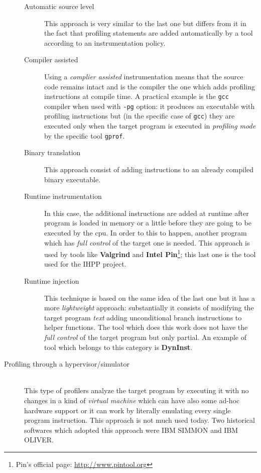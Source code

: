 \documentclass[a4paper,10pt]{report}
\begin{document}
\begin{description}
\begin{description}
\item[Automatic source level] This approach is very similar to the last one but
differs from it in the fact that profiling statements are added automatically by
a tool according to an instrumentation policy.

\item[Compiler assisted] Using a \emph{complier assisted} instrumentation means
that the source code remains intact and is the compiler the one which adds
profiling instructions at compile time. A practical example is the \verb|gcc| compiler when
used with \verb|-pg| option: it produces an executable with profiling
instructions but (in the specific case of \verb|gcc|) they are executed only when the
target program is executed in \emph{profiling mode} by the specific tool
\verb|gprof|.

\item[Binary translation]
This approach consist of adding instructions to an already compiled binary executable.

\item[Runtime instrumentation]
In this case, the additional instructions are added at runtime after program is
loaded in memory or a little before they are going to be executed by the
cpu. In order to this to happen, another program which has \emph{full control}
of the target one is needed. This approach is used by tools like
\textbf{Valgrind} and \textbf{Intel Pin}\footnote{Pin's official page:
\url{http://www.pintool.org}}; this last one is the tool used for the IHPP
project.

\item[Runtime injection] This technique is based on the same idea of the last
one but it has a more \emph{lightweight} approach: substantially it consists of
modifying the target program \emph{text} adding unconditional branch
instructions to helper functions. The tool which does this work does not have the
\emph{full control} of the target program but only partial. An example of tool
which belongs to this category is \textbf{DynInst}.

\end{description} 

\item[Profiling through a hypervisor/simulator] \hfill \\
This type of profilers analyze the target program by executing it with no
changes in a kind of \emph{virtual machine} which can have also some ad-hoc
hardware support or it can work by literally emulating every single program
instruction. This approach is not much used today. Two historical softwares
which adopted this approach were IBM SIMMON and IBM OLIVER.

\end{description}
\end{document}
